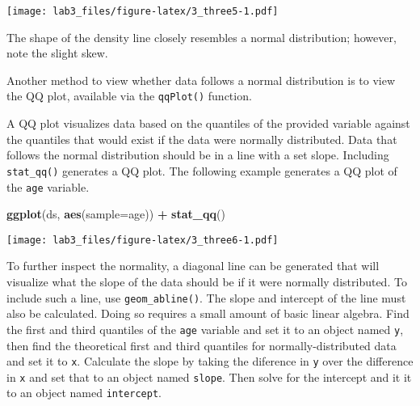 \documentclass[]{article}
\newenvironment{Shaded}{\begin{snugshade}}{\end{snugshade}}
\newcommand{\KeywordTok}[1]{\textcolor[rgb]{0.13,0.29,0.53}{\textbf{#1}}}
\newcommand{\DataTypeTok}[1]{\textcolor[rgb]{0.13,0.29,0.53}{#1}}
\newcommand{\StringTok}[1]{\textcolor[rgb]{0.31,0.60,0.02}{#1}}
\newcommand{\OperatorTok}[1]{\textcolor[rgb]{0.81,0.36,0.00}{\textbf{#1}}}
\newcommand{\NormalTok}[1]{#1}
\begin{document}
\texttt{[image: lab3\_files/figure-latex/3\_three5-1.pdf]}

The shape of the density line closely resembles a normal distribution;
however, note the slight skew.

Another method to view whether data follows a normal distribution is to
view the QQ plot, available via the \texttt{qqPlot()} function.

A QQ plot visualizes data based on the quantiles of the provided
variable against the quantiles that would exist if the data were
normally distributed. Data that follows the normal distribution should
be in a line with a set slope. Including \texttt{stat\_qq()} generates a
QQ plot. The following example generates a QQ plot of the \texttt{age}
variable.

\begin{Shaded}
\begin{Highlighting}[]
\KeywordTok{ggplot}\NormalTok{(ds, }\KeywordTok{aes}\NormalTok{(}\DataTypeTok{sample=}\NormalTok{age)) }\OperatorTok{+}
\StringTok{  }\KeywordTok{stat_qq}\NormalTok{()}
\end{Highlighting}
\end{Shaded}

\texttt{[image: lab3\_files/figure-latex/3\_three6-1.pdf]}

To further inspect the normality, a diagonal line can be generated that
will visualize what the slope of the data should be if it were normally
distributed. To include such a line, use \texttt{geom\_abline()}. The
slope and intercept of the line must also be calculated. Doing so
requires a small amount of basic linear algebra. Find the first and
third quantiles of the \texttt{age} variable and set it to an object
named \texttt{y}, then find the theoretical first and third quantiles
for normally-distributed data and set it to \texttt{x}. Calculate the
slope by taking the diference in \texttt{y} over the difference in
\texttt{x} and set that to an object named \texttt{slope}. Then solve
for the intercept and it it to an object named \texttt{intercept}.
\end{document}
